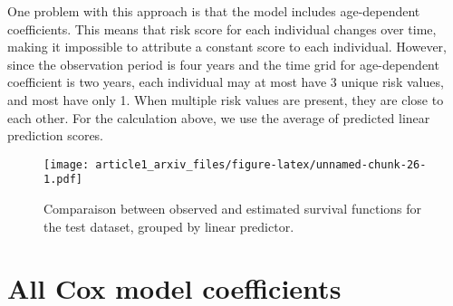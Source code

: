 \documentclass{article}
\begin{document}
One problem with this approach is that the model includes age-dependent
coefficients. This means that risk score for each individual changes
over time, making it impossible to attribute a constant score to each
individual. However, since the observation period is four years and the
time grid for age-dependent coefficient is two years, each individual
may at most have 3 unique risk values, and most have only 1. When
multiple risk values are present, they are close to each other. For the
calculation above, we use the average of predicted linear prediction
scores.

\begin{figure}
\centering
\texttt{[image: article1\_arxiv\_files/figure-latex/unnamed-chunk-26-1.pdf]}
\caption{\label{fig:compare_surv_test_risk_group} Comparaison between
observed and estimated survival functions for the test dataset, grouped
by linear predictor.}
\end{figure}

\newpage

\hypertarget{all-cox-model-coefficients}{%
\section{All Cox model coefficients}\label{all-cox-model-coefficients}}
\end{document}
